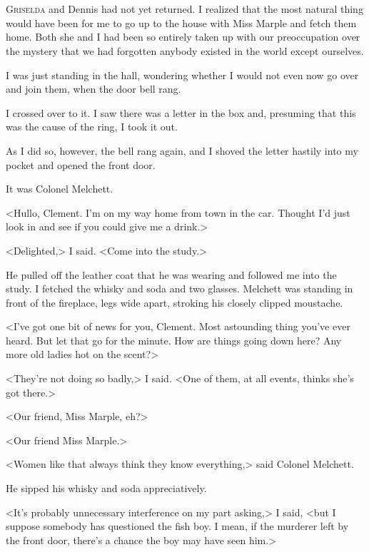\chapter[Chapter  \thechapter]{}


\lettrine{G}{riselda} and Dennis had not yet returned. I realized that the most natural thing would have been for me to go up to the house with Miss Marple and fetch them home. Both she and I had been so entirely taken up with our preoccupation over the mystery that we had forgotten anybody existed in the world except ourselves.

I was just standing in the hall, wondering whether I would not even now go over and join them, when the door bell rang.

I crossed over to it. I saw there was a letter in the box and, presuming that this was the cause of the ring, I took it out.

As I did so, however, the bell rang again, and I shoved the letter hastily into my pocket and opened the front door.

It was Colonel Melchett.

<Hullo, Clement. I'm on my way home from town in the car. Thought I'd just look in and see if you could give me a drink.>

<Delighted,> I said. <Come into the study.>

He pulled off the leather coat that he was wearing and followed me into the study. I fetched the whisky and soda and two glasses. Melchett was standing in front of the fireplace, legs wide apart, stroking his closely clipped moustache.

<I've got one bit of news for you, Clement. Most astounding thing you've ever heard. But let that go for the minute. How are things going down here? Any more old ladies hot on the scent?>

<They're not doing so badly,> I said. <One of them, at all events, thinks she's got there.>

<Our friend, Miss Marple, eh?>

<Our friend Miss Marple.>

<Women like that always think they know everything,> said Colonel Melchett.

He sipped his whisky and soda appreciatively.

<It's probably unnecessary interference on my part asking,> I said, <but I suppose somebody has questioned the fish boy. I mean, if the murderer left by the front door, there's a chance the boy may have seen him.>

